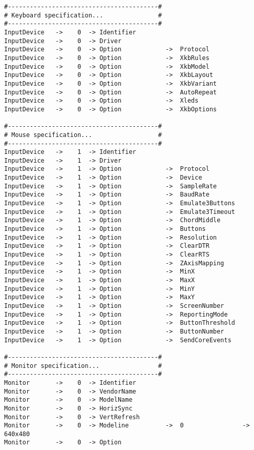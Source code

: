 \begin{appendix}
\begin{verbatim}
#-----------------------------------------#
# Keyboard specification...               #
#-----------------------------------------#
InputDevice   ->    0  -> Identifier
InputDevice   ->    0  -> Driver
InputDevice   ->    0  -> Option            ->  Protocol
InputDevice   ->    0  -> Option            ->  XkbRules
InputDevice   ->    0  -> Option            ->  XkbModel
InputDevice   ->    0  -> Option            ->  XkbLayout
InputDevice   ->    0  -> Option            ->  XkbVariant
InputDevice   ->    0  -> Option            ->  AutoRepeat
InputDevice   ->    0  -> Option            ->  Xleds
InputDevice   ->    0  -> Option            ->  XkbOptions

#-----------------------------------------#
# Mouse specification...                  #
#-----------------------------------------#
InputDevice   ->    1  -> Identifier
InputDevice   ->    1  -> Driver
InputDevice   ->    1  -> Option            ->  Protocol
InputDevice   ->    1  -> Option            ->  Device
InputDevice   ->    1  -> Option            ->  SampleRate
InputDevice   ->    1  -> Option            ->  BaudRate
InputDevice   ->    1  -> Option            ->  Emulate3Buttons
InputDevice   ->    1  -> Option            ->  Emulate3Timeout
InputDevice   ->    1  -> Option            ->  ChordMiddle
InputDevice   ->    1  -> Option            ->  Buttons
InputDevice   ->    1  -> Option            ->  Resolution
InputDevice   ->    1  -> Option            ->  ClearDTR
InputDevice   ->    1  -> Option            ->  ClearRTS
InputDevice   ->    1  -> Option            ->  ZAxisMapping
InputDevice   ->    1  -> Option            ->  MinX
InputDevice   ->    1  -> Option            ->  MaxX
InputDevice   ->    1  -> Option            ->  MinY
InputDevice   ->    1  -> Option            ->  MaxY
InputDevice   ->    1  -> Option            ->  ScreenNumber
InputDevice   ->    1  -> Option            ->  ReportingMode
InputDevice   ->    1  -> Option            ->  ButtonThreshold
InputDevice   ->    1  -> Option            ->  ButtonNumber
InputDevice   ->    1  -> Option            ->  SendCoreEvents

#-----------------------------------------#
# Monitor specification...                #
#-----------------------------------------#
Monitor       ->    0  -> Identifier
Monitor       ->    0  -> VendorName
Monitor       ->    0  -> ModelName
Monitor       ->    0  -> HorizSync
Monitor       ->    0  -> VertRefresh
Monitor       ->    0  -> Modeline          ->  0                -> 640x480
Monitor       ->    0  -> Option


\end{verbatim}
\end{appendix}
